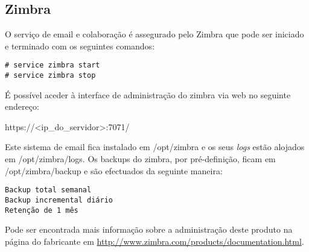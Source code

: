 \subsection{Zimbra}

O serviço de email e colaboração é assegurado pelo Zimbra que pode ser iniciado e terminado com os seguintes comandos:

\begin{verbatim}
# service zimbra start
# service zimbra stop
\end{verbatim}

É possível aceder à interface de administração do zimbra via web no seguinte endereço:

https://<ip\_do\_servidor>:7071/

Este sistema de email fica instalado em /opt/zimbra e os seus \emph{logs} estão alojados em /opt/zimbra/logs.
Os backups do zimbra, por pré-definição, ficam em /opt/zimbra/backup e são efectuados da seguinte maneira:

\begin{verbatim}
Backup total semanal
Backup incremental diário
Retenção de 1 mês
\end{verbatim}

Pode ser encontrada mais informação sobre a administração deste produto na página do fabricante em \url{http://www.zimbra.com/products/documentation.html}.
